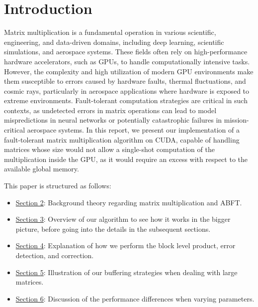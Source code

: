 \section{Introduction}

Matrix multiplication is a fundamental operation
in various scientific, engineering, and data-driven domains,
including deep learning, scientific simulations, and aerospace systems.
These fields often rely on high-performance hardware accelerators, such as GPUs,
to handle computationally intensive tasks.
However, the complexity and high utilization of modern GPU environments
make them susceptible to errors caused by hardware faults,
thermal fluctuations, and cosmic rays, particularly in aerospace applications
where hardware is exposed to extreme environments.
Fault-tolerant computation strategies are critical in such contexts,
as undetected errors in matrix operations can lead to model mispredictions
in neural networks or potentially catastrophic failures in mission-critical
aerospace systems.
In this report, we present our implementation of a fault-tolerant
matrix multiplication algorithm on CUDA, capable of handling matrices whose size would not allow a single-shot computation of the multiplication inside the GPU, as it would require an excess with respect to the available global memory.

This paper is structured as follows:
\begin{itemize}
  \item \hyperref[sec:background]{Section 2}: Background theory regarding matrix multiplication and ABFT.
  \item \hyperref[sec:overview]{Section 3}: Overview of our algorithm to see how it works in the bigger picture, before going into the details in the subsequent sections.
  \item \hyperref[sec:block]{Section 4}: Explanation of how we perform the block level product, error detection, and correction.
  \item \hyperref[sec:strategies]{Section 5}: Illustration of our buffering strategies when dealing with large matrices.
  \item \hyperref[sec:results]{Section 6}: Discussion of the performance differences when varying parameters.
\end{itemize}
